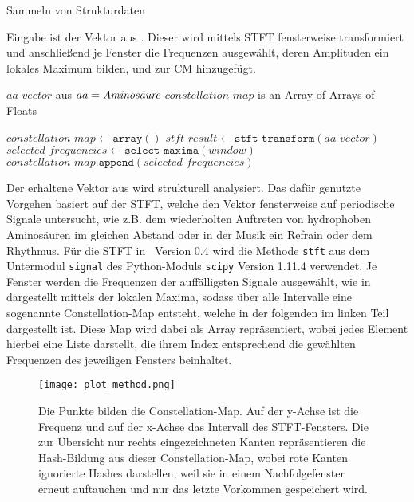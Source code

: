         \begin{algorithm}[H]
            \caption{Sammeln von Strukturdaten}\label{alg:strukturdaten}
            Eingabe ist der Vektor aus . Dieser wird mittels \acs{STFT} fensterweise transformiert und anschließend je Fenster die Frequenzen ausgewählt, deren Amplituden ein lokales Maximum bilden, und zur \acl{CM} hinzugefügt.
            \begin{algorithmic}[1]
                \Require $aa\_vector$ aus  \Comment $aa = \emph{Aminosäure}$
                \Ensure $constellation\_map$ is an Array of Arrays of Floats

                \State $constellation\_map \gets \texttt{array}()$
                \State $stft\_result \gets \texttt{stft\_transform}(aa\_vector)$
                    \State $selected\_frequencies \gets \texttt{select\_maxima}(window)$
                    \State $constellation\_map.\texttt{append}(selected\_frequencies)$
                \EndFor
            \end{algorithmic}
        \end{algorithm}
        Der erhaltene Vektor aus  wird strukturell analysiert. Das dafür genutzte Vorgehen basiert auf der \ac{STFT}, welche den Vektor fensterweise auf periodische Signale untersucht, wie z.B. dem wiederholten Auftreten von hydrophoben Aminosäuren im gleichen Abstand oder in der Musik ein Refrain oder dem Rhythmus. Für die \ac{STFT} in \protfin\ Version 0.4 wird die Methode \texttt{stft} aus dem Untermodul \texttt{signal} des Python-Moduls \texttt{scipy} \autocite{scipy} Version 1.11.4 verwendet. Je Fenster werden die Frequenzen der auffälligsten Signale ausgewählt, wie in  dargestellt mittels der lokalen Maxima, sodass über alle Intervalle eine sogenannte Constellation-Map entsteht, welche in der folgenden  im linken Teil dargestellt ist. Diese Map wird dabei als Array repräsentiert, wobei jedes Element hierbei eine Liste darstellt, die ihrem Index entsprechend die gewählten Frequenzen des jeweiligen Fensters beinhaltet.

        \begin{figure}[H]
            \centering
            \texttt{[image: plot\_method.png]}
            \caption[Constellation-Map und Hashing]{Die Punkte bilden die Constellation-Map. Auf der y-Achse ist die Frequenz und auf der x-Achse das Intervall des STFT-Fensters. Die zur Übersicht nur rechts eingezeichneten Kanten repräsentieren die Hash-Bildung aus dieser Constellation-Map, wobei rote Kanten ignorierte Hashes darstellen, weil sie in einem Nachfolgefenster erneut auftauchen und nur das letzte Vorkommen gespeichert wird.}
            \label{fig:hashing}
        \end{figure}

